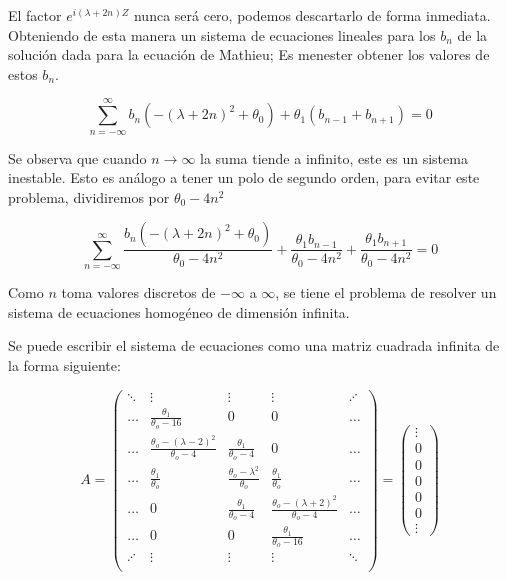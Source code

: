 El factor $e^{i(\lambda+2n)Z}$ nunca será cero, podemos descartarlo de forma inmediata. Obteniendo de esta manera un sistema de ecuaciones lineales para los $b_n$ de la solución dada para la ecuación de Mathieu; Es menester obtener los valores de estos $b_n$.

\begin{equation}\label{eq:E.7}
    \sum^{\infty}_{n=-\infty} b_n\left(-(\lambda+2n)^2+\theta_0\right) +\theta_1( b_{n-1}+b_{n+1})=0
\end{equation}

Se observa que cuando $n \rightarrow \infty$ la suma tiende a infinito, este es un sistema inestable. Esto es análogo a tener un polo de segundo orden\cite{Phelps}, para evitar este problema, dividiremos por $\theta_0-4n^2$

\begin{equation}\label{eq:E.8}
    \sum^{\infty}_{n=-\infty} \frac{b_n\left(-(\lambda+2n)^2+\theta_0\right)}{\theta_0-4n^2}+\frac{\theta_1b_{n-1}}{\theta_0-4n^2}+\frac{\theta_1b_{n+1}}{\theta_0-4n^2}=0
\end{equation}

Como $n$ toma valores discretos de $-\infty$ a $\infty$, se tiene el problema de resolver un sistema de ecuaciones homogéneo de dimensión infinita.

Se puede escribir el sistema de ecuaciones como una matriz cuadrada infinita de la forma siguiente:

\large
\begin{equation}\label{eq:E.9}
A=
\begin{pmatrix}
\ddots &  \vdots & \vdots & \vdots &\iddots \\
\dots &  \frac{\theta_1}{\theta_o-16} & 0 & 0 & \dots \\[0.3cm]
\dots  & \frac{\theta_o-(\lambda-2)^2}{\theta_o-4} & \frac{\theta_1}{\theta_o-4} & 0 & \dots\\[0.3cm] 
\dots & \frac{\theta_1}{\theta_o} & \frac{\theta_o-\lambda^2}{\theta_o} & \frac{\theta_1}{\theta_o} & \dots \\[0.3cm]
\ldots & 0 & \frac{\theta_1}{\theta_o-4} & \frac{\theta_o-(\lambda+2)^2}{\theta_o-4} & \dots\\[0.3cm]
\ldots & 0 & 0 & \frac{\theta_1}{\theta_o-16} & \dots \\
\iddots & \vdots & \vdots  & \vdots &\ddots \\
\end{pmatrix}
=\begin{pmatrix}
\vdots\\
0\\[0.3cm]
0\\[0.3cm]
0\\[0.3cm]
0\\[0.3cm]
0\\
\vdots
\end{pmatrix}
\end{equation}
\normalsize

